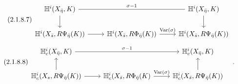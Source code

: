 \begin{equation}\tag{2.1.8.7}
\begin{tikzcd}
\mathbb{H}^i(X_{\bar{\eta}}, K) \arrow[rr, dash, "\sigma-1"] \arrow[d] & {} & \mathbb{H}^i(X_{\bar{\eta}}, K) \arrow[d] \\
\mathbb{H}^i(X_{\bar{s}}, R\Psi_{\bar{\eta}}(K)) \arrow[r] & \mathbb{H}^i(X_{\bar{s}}, R\Phi_{\bar{\eta}}(K)) \arrow[r, "\mathrm{Var}(\sigma)"] & \mathbb{H}^i(X_{\bar{s}}, R\Psi_{\bar{\eta}}(K))
\end{tikzcd}
\end{equation}
\begin{equation}\tag{2.1.8.8}
\begin{tikzcd}
\mathbb{H}^i_c(X_{\bar{\eta}}, K) \arrow[rr, "\sigma-1"] & {} & \mathbb{H}^i_c(X_{\bar{\eta}}, K) \\
\mathbb{H}^i_c(X_s, R\Psi_{\bar{\eta}}(K)) \arrow[r] \arrow[u] & \mathbb{H}^i_c(X_{\bar{s}}, R\Phi_{\bar{\eta}}(K) \arrow[r, "\mathrm{Var}(\sigma)"] & \mathbb{H}^i_c(X_{\bar{s}}, R\Psi_{\bar{\eta}}(K)) \arrow[u]
\end{tikzcd}\quad .
\end{equation}
